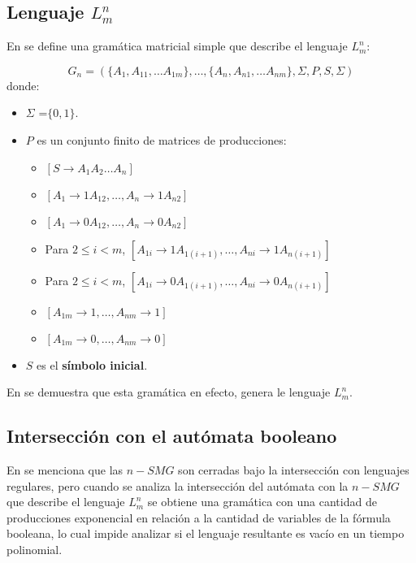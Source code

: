 \documentclass[12pt]{article}
\begin{document}
\subsection{Lenguaje $L^n_m$}

En \cite{aSMSAT} se define una gramática matricial simple que describe el lenguaje $L^n_m$:

$$
      G_n=(\{A_1,A_{11},\ldots A_{1m}\},\ldots,\{A_n,A_{n1},\ldots A_{nm}\},\Sigma,P,S,\Sigma)
$$
donde:
\begin{itemize}
      \item \( \Sigma \) =$\{0,1\}$.
      \item \( P \) es un conjunto finito de matrices de producciones:
            \begin{itemize}
                  \item  $[S \to A_1A_2\ldots A_n]$
                  \item  $[A_1 \to 1A_{12}, \ldots, A_n \to 1A_{n2}]$
                  \item  $[A_1 \to 0A_{12}, \ldots, A_n \to 0A_{n2}]$
                  \item  Para $2 \leq i < m$, $[A_{1i} \to 1A_{1(i+1)}, \ldots, A_{ni} \to 1A_{n(i + 1)}]$
                  \item  Para $2 \leq i < m$, $[A_{1i} \to 0A_{1(i+1)}, \ldots, A_{ni} \to 0A_{n(i + 1)}]$
                  \item  $[A_{1m} \to 1, \ldots, A_{nm} \to 1]$
                  \item  $[A_{1m} \to 0, \ldots, A_{nm} \to 0]$
            \end{itemize}
      \item \( S \) es el \textbf{símbolo inicial}.
\end{itemize}

En \cite{simpleMatrixLanguages} se demuestra que esta gramática en efecto, genera le lenguaje $L^n_m$.


\subsection{Intersección con el autómata booleano}

En \cite{aSMSAT} se menciona que las $n-SMG$ son cerradas bajo la intersección con lenguajes regulares, pero cuando se analiza la intersección del autómata con la $n-SMG$ que describe el lenguaje $L^n_m$ se obtiene una gramática con una cantidad de producciones exponencial en relación a la cantidad de variables de la fórmula booleana, lo cual impide analizar si el lenguaje resultante es vacío en un tiempo polinomial.
\end{document}
